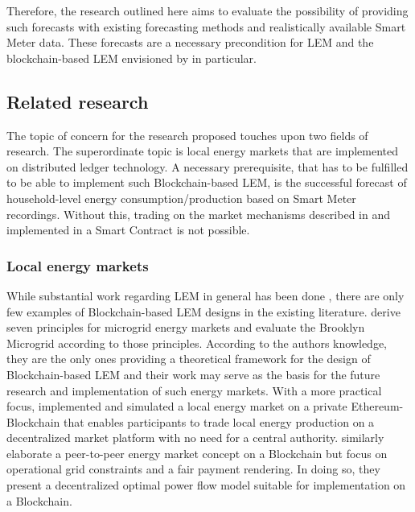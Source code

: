 Therefore, the research outlined here aims to evaluate the possibility of providing such forecasts with existing forecasting methods and realistically available Smart Meter data. These forecasts are a necessary precondition for LEM and the blockchain-based LEM envisioned by \citet{Mengelkamp:2018a} in particular.


\subsection{Related research}\label{Sec:Intro;Subsec:Related}
The topic of concern for the research proposed touches upon two fields of research. The superordinate topic is local energy markets that are implemented on distributed ledger technology. A necessary prerequisite, that has to be fulfilled to be able to implement such Blockchain-based LEM, is the successful forecast of household-level energy consumption/production based on Smart Meter recordings. Without this, trading on the market mechanisms described in \citet{Block:2008} and implemented in a Smart Contract \citet{Mengelkamp:2018a} is not possible.


\subsubsection{Local energy markets}
While substantial work regarding LEM in general has been done \citep[e.g.,][]{Lamparter:2010,Li:2015, Mihaylov:2014}, there are only few examples of Blockchain-based LEM designs in the existing literature. 
\citet{Mengelkamp:2018b} derive seven principles for microgrid energy markets and evaluate the Brooklyn Microgrid according to those principles. According to the authors knowledge, they are the only ones providing a theoretical framework for the design of Blockchain-based LEM and their work may serve as the basis for the future research and implementation of such energy markets.
With a more practical focus, \citet{Mengelkamp:2018a} implemented and simulated a local energy market on a private Ethereum-Blockchain  that enables participants to trade local energy production on a decentralized market platform with no need for a central authority.
\citet{Münsing:2017} similarly elaborate a peer-to-peer energy market concept on a Blockchain but focus on operational grid constraints and a fair payment rendering. In doing so, they present a decentralized optimal power flow model suitable for implementation on a Blockchain.




